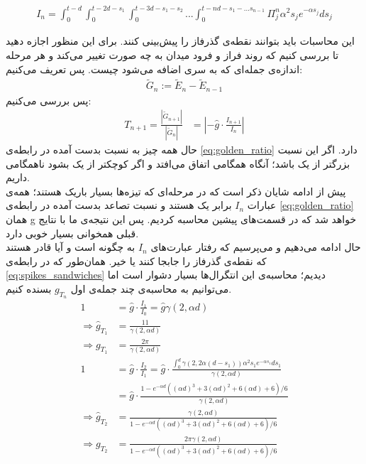\begin{align}
	I_n = \int_{0}^{t - d} \int_{0}^{t - 2d - s_1} \int_{0}^{t - 3d - s_1 - s_2} ... \int_{0}^{t - nd - s_1 - ... s_{n-1}} \Pi^n_j \alpha^2 s_j e^{-\alpha s_j} ds_j
	\label{eq:spikes_sandwiches}
\end{align}

این محاسبات باید بتوانند نقطه‌ی گذرفاز را پیش‌بینی کنند. برای این منظور اجازه دهید تا بررسی کنیم که روند فراز و فرود میدان به چه صورت تغییر می‌کند و هر مرحله اندازه‌ی جمله‌ای که به سری اضافه می‌شود چیست. پس تعریف می‌کنیم:
\begin{align}
	\tilde{G}_{n} := \tilde{E}_{n} - \tilde{E}_{n-1}
\end{align}
پس بررسی می‌کنیم:
\begin{align}
	T_{n+1} = \frac{|\tilde{G}_{n+1}|}{|\tilde{G}_{n}|} &= |-\hat{g} \cdot \frac{I_{n+1}}{I_n}|
	\label{eq:golden_ratio}
\end{align}
حال همه چیز به نسبت بدست آمده در رابطه‌ی
\ref{eq:golden_ratio}
دارد. اگر این نسبت بزرگتر از یک باشد؛ آنگاه همگامی اتفاق می‌افتد و اگر کوچکتر از یک بشود ناهمگامی داریم.\\
پیش از ادامه شایان ذکر است که در مرحله‌ای که تیزه‌ها بسیار باریک هستند؛ همه‌ی عبارات 
$I_n$
برابر یک هستند و نسبت تصاعد بدست آمده در رابطه‌ی 
\ref{eq:golden_ratio}
همان g خواهد شد که در قسمت‌های پیشین محاسبه کردیم. پس این نتیجه‌ی ما با نتایج قبلی همخوانی بسیار خوبی دارد.\\

حال ادامه می‌دهیم و می‌پرسیم که رفتار عبارت‌های 
$I_n$
به چگونه است و آیا قادر هستند که نقطه‌ی گذرفاز را جابجا کنند یا خیر. همان‌طور که در رابطه‌ی 
\ref{eq:spikes_sandwiches}
دیدیم؛ محاسبه‌ی این انتگرال‌ها بسیار دشوار است اما می‌توانیم به محاسبه‌ی چند جمله‌ی اول 
$g_{T_n}$
بسنده کنیم.
\begin{align}
	1 &= \hat{g} \cdot \frac{I_1}{I_0} = \hat{g} \gamma(2,\alpha d)\\
	\Rightarrow \hat{g}_{T_1} &= \frac{11}{\gamma(2,\alpha d)}\\
	\Rightarrow g_{T_1} &= \frac{2\pi}{\gamma(2,\alpha d)}\\
	1 &= \hat{g} \cdot \frac{I_2}{I_1} = \hat{g} \cdot \frac{\int_0^{d} \gamma(2,2\alpha (d-s_1)) \alpha^2 s_1 e^{-\alpha s_1} ds_1 }{\gamma(2,\alpha d)}\\
	&= \hat{g} \cdot \frac{1 - e^{- \alpha d}( (\alpha d)^3 + 3(\alpha d)^2 + 6(\alpha d) + 6)/6}{\gamma(2,\alpha d)}\\
	\Rightarrow \hat{g}_{T_2} &= \frac{\gamma(2,\alpha d)}{1 - e^{- \alpha d}( (\alpha d)^3 + 3(\alpha d)^2 + 6(\alpha d) + 6)/6}\\
	\Rightarrow g_{T_2} &= \frac{2\pi \gamma(2,\alpha d)}{1 - e^{- \alpha d}( (\alpha d)^3 + 3(\alpha d)^2 + 6(\alpha d) + 6)/6}
\end{align}

